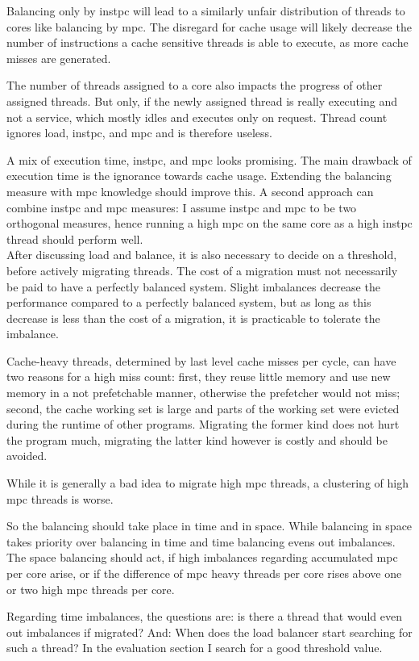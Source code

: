 Balancing only by \gls{instpc} will lead to a similarly unfair distribution of
threads to cores like balancing by \gls{mpc}.
The disregard for cache usage will likely decrease the number of instructions
a cache sensitive threads is able to execute, as more cache misses are
generated.

The number of threads assigned to a core also impacts the progress of other
assigned threads.
But only, if the newly assigned thread is really executing and not a service,
which mostly idles and executes only on request.
Thread count ignores load, \gls{instpc}, and \gls{mpc} and is therefore
useless.

A mix of execution time, \gls{instpc}, and \gls{mpc} looks promising.
The main drawback of execution time is the ignorance towards cache usage.
Extending the balancing measure with \gls{mpc} knowledge should improve this.
A second approach can combine \gls{instpc} and \gls{mpc} measures: I assume
\gls{instpc} and \gls{mpc} to be two orthogonal measures, hence running a
high \gls{mpc} on the same core as a high \gls{instpc} thread should perform
well.
\\


After discussing load and balance, it is also necessary to decide on a
threshold, before actively migrating threads.
The cost of a migration must not necessarily be paid to have a perfectly
balanced system.
Slight imbalances decrease the performance compared to a perfectly balanced
system, but as long as this decrease is less than the cost of a migration,
it is practicable to tolerate the imbalance.

Cache-heavy threads, determined by last level cache misses per cycle, can have
two reasons for a high miss count: first, they reuse little memory and use new
memory in a not prefetchable manner, otherwise the prefetcher would not miss;
second, the cache working set is large and parts of the working set were
evicted during the runtime of other programs.
Migrating the former kind does not hurt the program much, migrating the latter
kind however is costly and should be avoided.

While it is generally a bad idea to migrate high \gls{mpc} threads, a
clustering of high \gls{mpc} threads is worse.

So the balancing should take place in time and in space.
While balancing in space takes priority over balancing in time and time 
balancing evens out imbalances.
The space balancing should act, if high imbalances regarding accumulated
\gls{mpc} per core arise, or if the difference of \gls{mpc} heavy threads per
core rises above one or two high \gls{mpc} threads per core.

Regarding time imbalances, the questions are: is there a thread that would even
out imbalances if migrated? And: When does the load balancer start searching
for such a thread?
In the evaluation section I search for a good threshold value.
